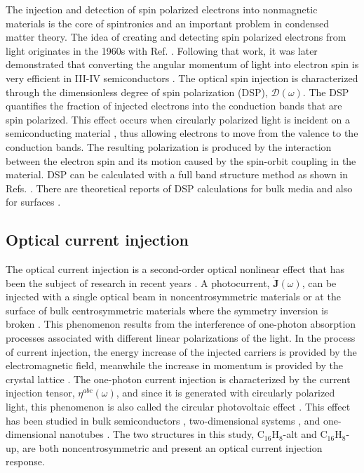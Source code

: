 \documentclass[pss]{wiley2sp} %
\begin{document}
The injection and detection of spin polarized electrons into nonmagnetic materials is the core of spintronics \cite{vzuticRMP04,fertRMP08} and an important problem in condensed matter theory. The idea of creating and detecting spin polarized electrons from light originates in the 1960s with Ref. \cite{lampelPRL68}. Following that work, it was later demonstrated that converting the angular momentum of light into electron spin is very efficient in III-IV semiconductors \cite{dyakonovOO84}. The optical spin injection is characterized through the dimensionless degree of spin polarization (DSP), $\boldsymbol{\mathcal{D}}(\omega)$. The DSP quantifies the fraction of injected electrons into the conduction bands that are spin polarized. This effect occurs when circularly polarized light is incident on a semiconducting material \cite{dyakonovOO84}, thus allowing electrons to move from the valence to the conduction bands. The resulting polarization is produced by the interaction between the electron spin and its motion caused by the spin-orbit coupling in the material. DSP can be calculated with a full band structure method as shown in Refs. \cite{nastosPRB07,cabellosPRB09}. There are theoretical reports of DSP
calculations for bulk media \cite{nastosPRB07,cabellosPRB09} and also for
surfaces \cite{mendozaPRB12,arzatePRB14}.


\subsection{Optical current injection}

The optical current injection is a second-order optical nonlinear effect that
has been the subject of research in recent years
\cite{arzatePRB14,bhatPRB05,fraserPRL99,hachePRL97,lamanAPL99}. A
photocurrent, $\mathbf{\dot{J}}(\omega)$, can be injected with a single
optical beam in noncentrosymmetric materials or at the surface of bulk
centrosymmetric materials where the symmetry inversion is broken
\cite{arzatePRB14}. This phenomenon results from the interference of one-photon 
absorption processes associated with different linear polarizations of
the light. In the process of current injection, the energy increase of the
injected carriers is provided by the electromagnetic field, meanwhile the
increase in momentum is provided by the crystal lattice \cite{arzatePRB14}.
The one-photon current injection is characterized by the current injection
tensor, $\eta^{abc}(\omega)$, and since it is generated with circularly
polarized light, this phenomenon is also called the circular photovoltaic
effect \cite{sturmanCRCP92}. This effect has been studied in bulk
semiconductors \cite{hachePRL97,sipePRB00}, two-dimensional systems
\cite{melePRB00,cabellosPRB11}, and one-dimensional nanotubes
\cite{melePRB00}. The two structures in this study, C$_{16}$H$_{8}$-alt and
C$_{16}$H$_{8}$-up, are both noncentrosymmetric and present an optical current
injection response.
\end{document}
